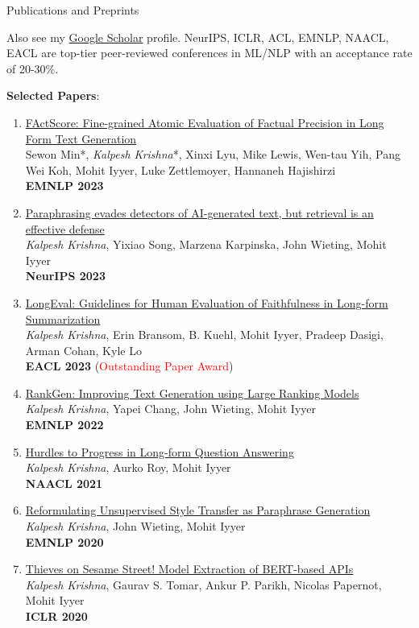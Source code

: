 \documentclass{resume} %
\begin{document}
\begin{rSection}{Publications and Preprints}
\vspace*{0.1in}

Also see my \href{https://scholar.google.com/citations?hl=en&user=9g2BsMUAAAAJ}{Google Scholar} profile. NeurIPS, ICLR, ACL, EMNLP, NAACL, EACL are top-tier peer-reviewed conferences in ML/NLP with an acceptance rate of  20-30\%.
\vspace{0.05in}

\textbf{Selected Papers}:
\begin{enumerate}[leftmargin=*]
\setlength\itemsep{0.4em}

\item \href{https://arxiv.org/abs/2305.14251}{FActScore: Fine-grained Atomic Evaluation of Factual Precision in Long Form Text Generation} \\
Sewon Min*, \emph{Kalpesh Krishna}*, Xinxi Lyu, Mike Lewis, Wen-tau Yih, Pang Wei Koh, Mohit Iyyer, Luke Zettlemoyer, Hannaneh Hajishirzi \\
\textbf{EMNLP 2023}

\item \href{https://arxiv.org/abs/2303.13408}{Paraphrasing evades detectors of AI-generated text, but retrieval is an effective defense} \\
\textit{Kalpesh Krishna}, Yixiao Song, Marzena Karpinska, John Wieting, Mohit Iyyer \\
\textbf{NeurIPS 2023}

\item \href{https://arxiv.org/abs/2301.13298}{LongEval: Guidelines for Human Evaluation of Faithfulness in Long-form Summarization} \\
\textit{Kalpesh Krishna}, Erin Bransom, B. Kuehl, Mohit Iyyer, Pradeep Dasigi, Arman Cohan, Kyle Lo \\
\textbf{EACL 2023} (\textcolor{red}{Outstanding Paper Award})

\item \href{https://arxiv.org/abs/2205.09726}{RankGen: Improving Text Generation using Large Ranking Models} \\
\textit{Kalpesh Krishna}, Yapei Chang, John Wieting, Mohit Iyyer \\
\textbf{EMNLP 2022}


\item \href{https://arxiv.org/abs/2103.06332}{Hurdles to Progress in Long-form Question Answering} \\
\textit{Kalpesh Krishna}, Aurko Roy, Mohit Iyyer \\
\textbf{NAACL 2021}
\item \href{https://arxiv.org/abs/2010.05700}{Reformulating Unsupervised Style Transfer as Paraphrase Generation} \\ \textit{Kalpesh Krishna}, John Wieting, Mohit Iyyer \\ \textbf{EMNLP 2020} 
\item \href{https://arxiv.org/abs/1910.12366}{Thieves on Sesame Street! Model Extraction of BERT-based APIs} \\ \textit{Kalpesh Krishna}, Gaurav S. Tomar, Ankur P. Parikh, Nicolas Papernot, Mohit Iyyer \\ \textbf{ICLR 2020}


\end{enumerate}
\end{rSection}
\end{document}
